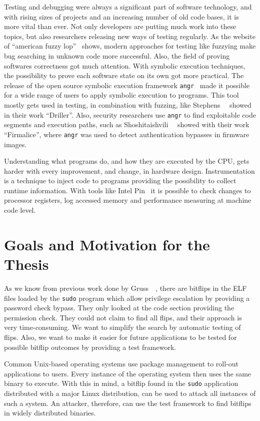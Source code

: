 Testing and debugging were always a significant part of software technology, and
with rising sizes of projects and an increasing number of old code bases, it is
more vital than ever. Not only developers are putting much work into these
topics, but also researchers releasing new ways of testing regularly. As the
website of ``american fuzzy lop''~\cite{aflweb} shows, modern approaches for
testing like fuzzying make bug searching in unknown code more successful. Also,
the field of proving software\textquotesingle s correctness got much attention.
With symbolic execution techniques, the possibility to prove each software state
on its own got more practical. The release of the open source symbolic execution
framework \texttt{angr}~\cite{angrpaper} made it possible for a wide range of
users to apply symbolic execution to programs. This tool mostly gets used in
testing, in combination with fuzzing, like Stephens~\etal~\cite{driller} showed
in their work ``Driller''. Also, security researchers use \texttt{angr} to find
exploitable code segments and execution paths, such as
Shoshitaishvili~\etal~\cite{boomerang} showed with their work ``Firmalice'',
where \texttt{angr} was used to detect authentication bypasses in firmware
images.

Understanding what programs do, and how they are executed by the CPU, gets
harder with every improvement, and change, in hardware design. Instrumentation
is a technique to inject code to programs providing the possibility to collect
runtime information. With tools like Intel Pin~\cite{pintool} it is possible to
check changes to processor registers, log accessed memory and performance
measuring at machine code level.

\section{Goals and Motivation for the Thesis}

As we know from previous work done by Gruss~\etal~\cite{flipinthewall}, there
are bitflips in the ELF files loaded by the \texttt{sudo} program which allow
privilege escalation by providing a password check bypass. They only looked at
the code section providing the permission check. They could not claim to find
all flips, and their approach is very time-consuming. We want to simplify the
search by automatic testing of flips. Also, we want to make it easier for future
applications to be tested for possible bitflip outcomes by providing a test
framework.

Common Unix-based operating systems use package management to roll-out
applications to users. Every instance of the operating system then uses the same
binary to execute. With this in mind, a bitflip found in the \texttt{sudo}
application distributed with a major Linux distribution, can be used to attack
all instances of such a system. An attacker, therefore, can use the test
framework to find bitflips in widely distributed binaries.

